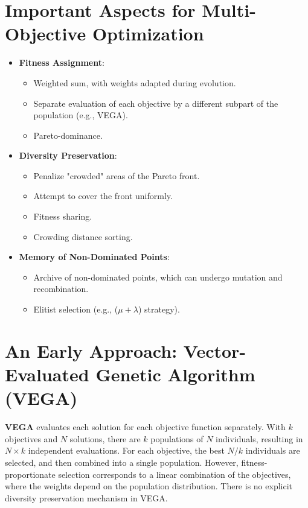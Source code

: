 \section{Important Aspects for Multi-Objective Optimization}
\begin{itemize}
    \item \textbf{Fitness Assignment}:
    \begin{itemize}
        \item Weighted sum, with weights adapted during evolution.
        \item Separate evaluation of each objective by a different subpart of the population (e.g., VEGA).
        \item Pareto-dominance.
    \end{itemize}
    \item \textbf{Diversity Preservation}:
    \begin{itemize}
         \item Penalize "crowded" areas of the Pareto front.
        \item Attempt to cover the front uniformly.
        \item Fitness sharing.
        \item Crowding distance sorting.
    \end{itemize}
     \item \textbf{Memory of Non-Dominated Points}:
    \begin{itemize}
          \item Archive of non-dominated points, which can undergo mutation and recombination.
        \item Elitist selection (e.g., ($\mu + \lambda$) strategy).
    \end{itemize}
\end{itemize}

\section{An Early Approach: Vector-Evaluated Genetic Algorithm (VEGA)}

\textbf{VEGA} evaluates each solution for each objective function separately.
With $k$ objectives and $N$ solutions, there are $k$ populations of $N$ individuals, resulting in $N \times k$ independent evaluations.
For each objective, the best $N/k$ individuals are selected, and then combined into a single population.
However, fitness-proportionate selection corresponds to a linear combination of the objectives, where the weights depend on the population distribution. There is no explicit diversity preservation mechanism in VEGA.

